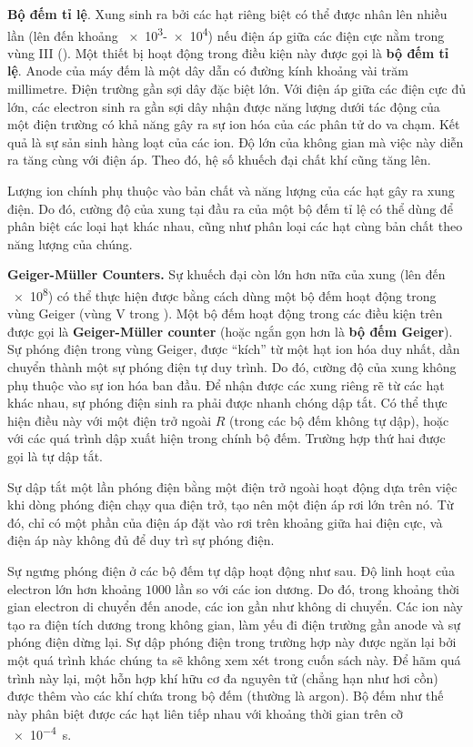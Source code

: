 \textbf{Bộ đếm tỉ lệ}. Xung sinh ra bởi các hạt riêng biệt có thể được nhân lên nhiều lần (lên đến khoảng \num{e3}-\num{e4}) nếu điện áp giữa các điện cực nằm trong vùng III ().
Một thiết bị hoạt động trong điều kiện này được gọi là \textbf{bộ đếm tỉ lệ}.
Anode của máy đếm là một dây dẫn có đường kính khoảng vài trăm millimetre.
Điện trường gần sợi dây đặc biệt lớn.
Với điện áp giữa các điện cực đủ lớn, các electron sinh ra gần sợi dây nhận được năng lượng dưới tác động của một điện trường có khả năng gây ra sự ion hóa của các phân tử do va chạm.
Kết quả là sự sản sinh hàng loạt của các ion. Độ lớn của không gian mà việc này diễn ra tăng cùng với điện áp. Theo đó, hệ số khuếch đại chất khí cũng tăng lên.

Lượng ion chính phụ thuộc vào bản chất và năng lượng của các hạt gây ra xung điện. Do đó, cường độ của xung tại đầu ra của một bộ đếm tỉ lệ có thể dùng để phân biệt các loại hạt khác nhau, cũng như phân loại các hạt cùng bản chất theo năng lượng của chúng.

\textbf{Geiger-M\"uller Counters.} Sự khuếch đại còn lớn hơn nữa của xung (lên đến \num{e8}) có thể thực hiện được bằng cách dùng một bộ đếm hoạt động trong vùng Geiger (vùng V trong ).
Một bộ đếm hoạt động trong các điều kiện trên được gọi là \textbf{Geiger-M\"uller counter} (hoặc ngắn gọn hơn là \textbf{bộ đếm Geiger}).
Sự phóng điện trong vùng Geiger, được ``kích'' từ một hạt ion hóa duy nhất, dần chuyển thành một sự phóng điện tự duy trình.
Do đó, cường độ của xung không phụ thuộc vào sự ion hóa ban đầu.
Để nhận được các xung riêng rẽ từ các hạt khác nhau, sự phóng điện sinh ra phải được nhanh chóng dập tắt.
Có thể thực hiện điều này với một điện trở ngoài $R$ (trong các bộ đếm không tự dập), hoặc với các quá trình dập xuất hiện trong chính bộ đếm. 
Trường hợp thứ hai được gọi là tự dập tắt.

Sự dập tắt một lần phóng điện bằng một điện trở ngoài hoạt động dựa trên việc khi dòng phóng điện chạy qua điện trở, tạo nên một điện áp rơi lớn trên nó.
Từ đó, chỉ có một phần của điện áp đặt vào rơi trên khoảng giữa hai điện cực, và điện áp này không đủ để duy trì sự phóng điện.

Sự ngưng phóng điện ở các bộ đếm tự dập hoạt động như sau.
Độ linh hoạt của electron lớn hơn khoảng $1000$ lần so với các ion dương. Do đó, trong khoảng thời gian electron di chuyển đến anode, các ion gần như không di chuyển.
Các ion này tạo ra điện tích dương trong không gian, làm yếu đi điện trường gần anode và sự phóng điện dừng lại.
Sự dập phóng điện trong trường hợp này được ngăn lại bởi một quá trình khác chúng ta sẽ không xem xét trong cuốn sách này. Để hãm quá trình này lại, một hỗn hợp khí hữu cơ đa nguyên tử (chẳng hạn như hơi cồn) được thêm vào các khí chứa trong bộ đếm (thường là argon).
Bộ đếm như thế này phân biệt được các hạt liên tiếp nhau với khoảng thời gian trên cỡ \SI{e-4}{\second}.

